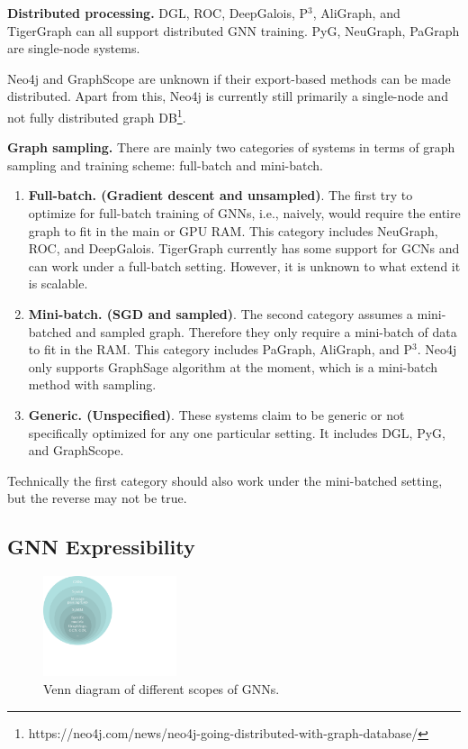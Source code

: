 \vspace{2mm}
\noindent \textbf{Distributed processing.} DGL, ROC, DeepGalois, P$^{3}$, AliGraph, and TigerGraph can all support distributed GNN training. PyG, NeuGraph, PaGraph are single-node systems.

Neo4j and GraphScope are unknown if their export-based methods can be made distributed. Apart from this, Neo4j is currently still primarily a single-node and not fully distributed graph DB\footnote{https://neo4j.com/news/neo4j-going-distributed-with-graph-database/}.

\vspace{2mm}
\noindent \textbf{Graph sampling.} 
There are mainly two categories of systems in terms of graph sampling and training scheme: full-batch and mini-batch.
\begin{enumerate}
\item \textbf{Full-batch. (Gradient descent and unsampled)}.
The first try to optimize for full-batch training of GNNs, i.e., naively, would require the entire graph to fit in the main or GPU RAM. This category includes NeuGraph, ROC, and DeepGalois. TigerGraph currently has some support for GCNs and can work under a full-batch setting. However, it is unknown to what extend it is scalable.
\item \textbf{Mini-batch. (SGD and sampled)}. The second category assumes a mini-batched and sampled graph. Therefore they only require a mini-batch of data to fit in the RAM. This category includes PaGraph, AliGraph, and P$^{3}$. Neo4j only supports GraphSage algorithm at the moment, which is a mini-batch method with sampling. 
\item \textbf{Generic. (Unspecified)}. These systems claim to be generic or not specifically optimized for any one particular setting. It includes DGL, PyG, and GraphScope.
\end{enumerate}
Technically the first category should also work under the mini-batched setting, but the reverse may not be true.  


\subsection{GNN Expressibility}
\begin{figure}[t]
 \centering
\includegraphics[width=0.35\textwidth]{./images/venn_diagram.pdf}
 \caption{Venn diagram of different scopes of GNNs.}
 \label{fig:venn}
\end{figure}


